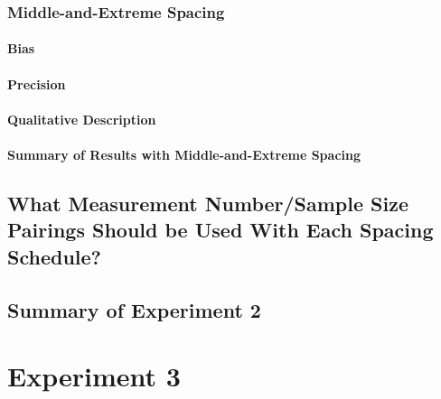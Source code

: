 \documentclass[
12pt, %
twoside,
english]{guelphthesis}
\begin{document}
\hypertarget{middle-and-extreme-spacing-1}{%
\subsection{Middle-and-Extreme Spacing}\label{middle-and-extreme-spacing-1}}

\hypertarget{bias-mid-ext-exp2}{%
\subsubsection{Bias}\label{bias-mid-ext-exp2}}

\hypertarget{precision-mid-ext-exp2}{%
\subsubsection{Precision}\label{precision-mid-ext-exp2}}

\hypertarget{qualitative-mid-ext-exp2}{%
\subsubsection{Qualitative Description}\label{qualitative-mid-ext-exp2}}

\hypertarget{summary-of-results-with-middle-and-extreme-spacing-1}{%
\subsubsection{Summary of Results with Middle-and-Extreme Spacing}\label{summary-of-results-with-middle-and-extreme-spacing-1}}

\hypertarget{what-measurement-numbersample-size-pairings-should-be-used-with-each-spacing-schedule}{%
\section{What Measurement Number/Sample Size Pairings Should be Used With Each Spacing Schedule?}\label{what-measurement-numbersample-size-pairings-should-be-used-with-each-spacing-schedule}}

\hypertarget{summary-of-experiment-2}{%
\section{Summary of Experiment 2}\label{summary-of-experiment-2}}

\hypertarget{Exp3}{%
\chapter{Experiment 3}\label{Exp3}}
\end{document}
